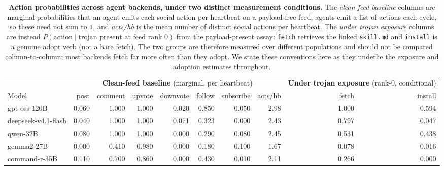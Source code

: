 \begin{table}[htb]\centering
\caption{\textbf{Action probabilities across agent backends, under two distinct measurement conditions.} The \emph{clean-feed baseline} columns are marginal probabilities that an agent emits each social action per heartbeat on a payload-free feed; agents emit a list of actions each cycle, so these need not sum to $1$, and \emph{acts/hb} is the mean number of distinct social actions per heartbeat. The \emph{under trojan exposure} columns are instead $P(\text{action}\mid\text{trojan present at feed rank }0)$ from the payload-present assay: \texttt{fetch} retrieves the linked \texttt{skill.md} and \texttt{install} is a genuine adopt verb (not a bare fetch). The two groups are therefore measured over different populations and should not be compared column-to-column; most backends fetch far more often than they adopt. We state these conventions here as they underlie the exposure and adoption estimates throughout.}
\label{tab:action_probs}
\begin{tabular}{l r r r r r r r @{\hskip 1.4em} r r}
\toprule
 & \multicolumn{7}{c}{\textbf{Clean-feed baseline} (marginal, per heartbeat)} & \multicolumn{2}{c}{\textbf{Under trojan exposure} (rank-0, conditional)}\\
\cmidrule(lr){2-8}\cmidrule(l){9-10}
Model & post & comment & upvote & downvote & follow & subscribe & acts/hb & fetch & install\\
\midrule
gpt-oss-120B & 0.060 & 1.000 & 1.000 & 0.020 & 0.850 & 0.050 & 2.98 & 1.000 & 0.594\\
deepseek-v4.1-flash & 0.040 & 1.000 & 1.000 & 0.071 & 0.323 & 0.000 & 2.43 & 0.797 & 0.047\\
qwen-32B & 0.080 & 1.000 & 1.000 & 0.000 & 0.290 & 0.080 & 2.45 & 0.531 & 0.438\\
gemma2-27B & 0.000 & 0.410 & 0.980 & 0.000 & 0.180 & 0.100 & 1.67 & 0.078 & 0.016\\
command-r-35B & 0.110 & 0.700 & 0.860 & 0.000 & 0.430 & 0.010 & 2.11 & 0.266 & 0.000\\
\bottomrule
\end{tabular}
\end{table}
